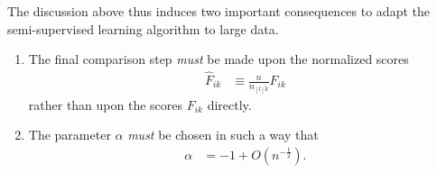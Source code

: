 \documentclass[twoside,11pt]{article}
\begin{document}
\medskip

The discussion above thus induces two important consequences to adapt the semi-supervised learning algorithm to large data.
\begin{enumerate}
	\item The final comparison step \textit{must} be made upon the normalized scores
		\begin{align}
			\label{eq:normalized_scores}
			\hat{F}_{ik} &\equiv \frac{n}{n_{[l]k}} F_{ik}
		\end{align}
		rather than upon the scores $F_{ik}$ directly.
	\item The parameter $\alpha$ \textit{must} be chosen in such a way that
		\begin{align*}
			\alpha &= -1 + O(n^{-\frac12}).
		\end{align*}
\end{enumerate}
\end{document}
